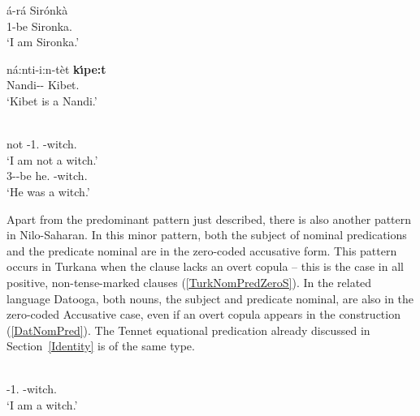 \begin{exe}\ex \label{MaaNomPred}
\gll \'a-r\'a Sir\'onk\`a\\
			1\sg{}-be Sironka.\acc{}\\
\glt `I am Sironka.' 
\end{exe}

\begin{exe}\ex\label{NanNomPred}
\gll n\'a:nti-i:n-t\`et \textbf{k\'\i pe:t}\\
Nandi-\sg{}-\them{} Kibet.\nom{}\\
\glt `Kibet is a Nandi.'
\end{exe}

\begin{exe}\ex\label{TurNomPred}
\begin{xlist}\ex\gll{}  \\
not \NC{}-1\sg{}.\nom{} \NC{}-witch.\acc{}\\
\glt `I am not a witch.'
\ex\gll {}  \\
3-\pst{}-be he.\nom{} \NC{}-witch.\acc{}\\
\glt `He was a witch.'
\end{xlist}
\end{exe}

Apart from the predominant pattern just described, there is also another pattern in Nilo-Saharan. 
In this minor pattern, both the subject of nominal predications and the predicate nominal are in the zero-coded accusative form. 
This pattern occurs in Turkana when the clause lacks an overt copula -- this is the case in all positive, non-tense-marked clauses (\ref{TurkNomPredZeroS}). 
In the related language Datooga, both nouns, the subject and predicate nominal, are also in the zero-coded Accusative case, even if an overt copula appears in the construction (\ref{DatNomPred}). 
The Tennet equational predication already discussed in Section~\ref{Identity} is of the same type. 

\begin{exe}\ex\label{TurkNomPredZeroS}
\gll{} \\
\NC{}-1\sg{}.\acc{} \NC{}-witch.\acc{}\\
\glt `I am a witch.'\end{exe}


